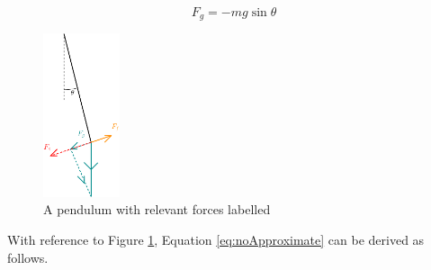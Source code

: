 \documentclass[letterpaper, 12pt]{article}
\begin{document}
\begin{equation}
    F_g = -mg\sin\theta
\end{equation}

\begin{figure}[H]
    \centering
    \includegraphics[width=0.2\textwidth]{forcesOnPendulum.png}
    \caption{A pendulum with relevant forces labelled}
    \label{fig:f_netPendulum}
\end{figure}

With reference to Figure \ref*{fig:f_netPendulum}, Equation \ref*{eq:noApproximate}
can be derived as follows.
\end{document}
